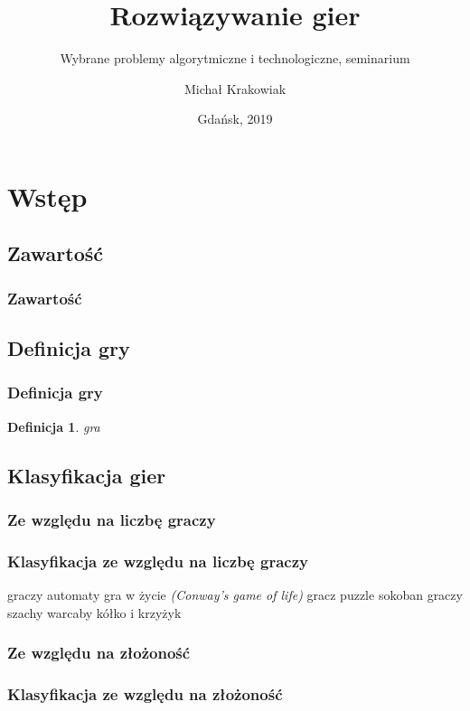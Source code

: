\documentclass[polish,envcountsect,10pt]{beamer}
\title{Rozwiązywanie gier}
\author{Michał Krakowiak}
\subtitle{Wybrane problemy algorytmiczne i technologiczne, seminarium}
\date{Gdańsk, 2019}
\newtheorem{mdfn}{Definicja}
\begin{document}
    \frame{\titlepage}
    \section{Wstęp}
        \subsection{Zawartość}
            \begin{frame}
                \frametitle{Zawartość}
                \tableofcontents[pausesections]
            \end{frame}
        \subsection{Definicja gry}
            \begin{frame}
                \frametitle{Definicja gry}
                \begin{mdfn}
                    gra
                \end{mdfn}
            \end{frame}
        \subsection{Klasyfikacja gier}
            \subsubsection{Ze względu na liczbę graczy}
                \begin{frame}
                    \frametitle{Klasyfikacja ze względu na liczbę graczy}
                    \begin{outline}
                         graczy \pause automaty \pause
                            \2 gra w życie \textit{(Conway's game of life)}\pause
                         gracz \pause puzzle \pause
                            \2 sokoban \pause
                         graczy \pause
                            \2 szachy \pause
                            \2 warcaby \pause
                            \2 kółko i krzyżyk
                    \end{outline}
                \end{frame}
            \subsubsection{Ze względu na złożoność}
                \begin{frame}
                    \frametitle{Klasyfikacja ze względu na złożoność}
                \end{frame}
\end{document}
